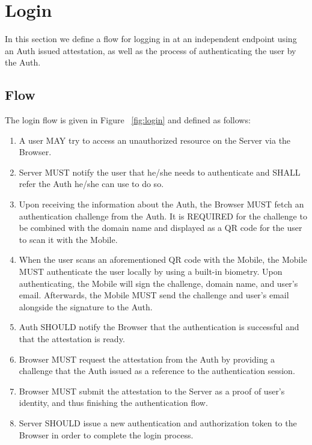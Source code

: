 \section{Login}
In this section we define a flow for logging in at an independent endpoint using an Auth
issued attestation, as well as the process of authenticating the user by the Auth. 

    \subsection{Flow}
    The login flow is given in Figure ~\ref{fig:login} and defined as follows:
        \begin{enumerate}
            \item A user MAY try to access an unauthorized resource on the Server via the Browser.
            \item Server MUST notify the user that he/she needs to authenticate and SHALL refer the Auth he/she 
                  can use to do so.
            \item Upon receiving the information about the Auth, the Browser MUST fetch an authentication challenge
                  from the Auth. It is REQUIRED for the challenge to be combined with the domain name and
                  displayed as a QR code for the user to scan it with the Mobile.
            \item When the user scans an aforementioned QR code with the Mobile, the Mobile MUST authenticate the 
                  user locally by using a built-in biometry. Upon authenticating, the Mobile will sign the 
                  challenge, domain name, and user's email. Afterwards, the Mobile MUST send the challenge and user's
                  email alongside the signature to the Auth.
            \item Auth SHOULD notify the Browser that the authentication is successful and that the attestation is
                  ready.
            \item Browser MUST request the attestation from the Auth by providing a challenge that the Auth issued 
                  as a reference to the authentication session.
            \item Browser MUST submit the attestation to the Server as a proof of user's identity, and thus finishing 
                  the authentication flow.
            \item Server SHOULD issue a new authentication and authorization token to the Browser in order to complete
                  the login process.
        \end{enumerate}
        

